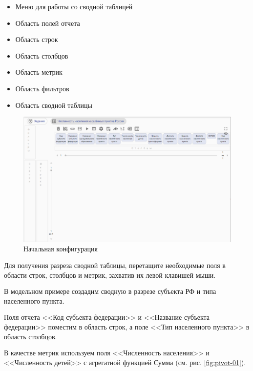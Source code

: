 \documentclass[../user-manual.tex]{subfiles}
\begin{document}
	\begin{itemize}
		
		\item Меню для работы со сводной таблицей
		
		\item Область полей отчета
		
		\item Область строк
		
		\item Область столбцов
		
		\item Область метрик
		
		\item Область фильтров
		
		\item Область сводной таблицы
	\end{itemize}
				
	\begin{figure}[h]
		\centering
		\includegraphics[width=\graphicswidth]{img/2-empty-pivot.png}
		\caption{Начальная конфигурация}
		\label{fig:empty-pivot}
	\end{figure}	

	Для получения разреза сводной таблицы, перетащите необходимые поля в области строк, столбцов и метрик, захватив их левой клавишей мыши.
	
	\begin{modelExample}
		В модельном примере создадим сводную в разрезе субъекта РФ и типа населенного пункта.		
		
		Поля отчета <<Код субъекта федерации>> и <<Название субъекта федерации>> поместим в область строк, а поле <<Тип населенного пункта>> в область столбцов.		
		
		В качестве метрик используем поля <<Численность населения>> и <<Численность детей>> с агрегатной функцией Сумма (см. рис. \ref{fig:pivot-01}).
	\end{modelExample}
\end{document}
